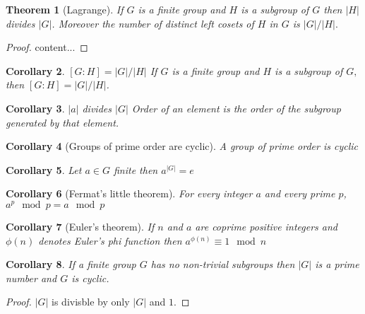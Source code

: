 \documentclass[oneside,11pt,pdftex]{book}%
\numberwithin{equation}{section}
\newtheorem{theorem}{Theorem}[chapter]%
\newtheorem{corollary}[theorem]{Corollary}
\numberwithin{section}{chapter}
\numberwithin{equation}{chapter}
\begin{document}
\begin{theorem}[Lagrange]
	If $ G $ is a finite group and $ H$ is a subgroup of $ G $ then $ |H| $ divides $ |G| $. Moreover the number of distinct left cosets of $ H $ in $ G $ is $ |G|/|H|. $
\end{theorem}
\begin{proof}
	content...
\end{proof}


\begin{corollary}{$ [G:H]=|G|/|H| $}
	If $ G $ is a finite group and $ H $ is a subgroup of $ G, $ then $ [G:H]=|G|/|H| $.
\end{corollary}

\begin{corollary}{$ |a| $ divides $ |G| $}
	Order of an element is the order of the subgroup generated by that element.
\end{corollary}

\begin{corollary}[Groups of prime order are cyclic]
	A group of prime order is cyclic
\end{corollary}

\begin{corollary}
	Let $ a \in G$ finite then $ a^{|G|}=e $
\end{corollary}

\begin{corollary}[Fermat's little theorem]
	For every integer $ a $ and every prime $ p $, $ a^p \mod p = a \mod p $
\end{corollary}

\begin{corollary}[Euler's theorem]
	If $ n $ and $ a $ are coprime positive integers and $ \phi(n) $ denotes Euler's phi function then $ a^{\phi(n)} \equiv 1 \mod n$
\end{corollary}

\begin{corollary}
	If a finite group $ G $ has no non-trivial subgroups then $ |G| $ is a prime number and $ G $ is cyclic.
\end{corollary}
\begin{proof}
	$ |G| $ is divisble by only $ |G| $ and $ 1 $.
\end{proof}

\backmatter



\thispagestyle{empty}%
{\ }
\newpage
\end{document}

